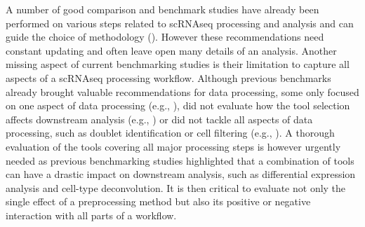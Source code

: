 \documentclass{bmcart}
\begin{document}
A number of good comparison and benchmark studies have already been performed on various steps related to scRNAseq processing and analysis and can guide the choice of methodology (\citealp{CobosDeconvolution2020, colePerformance2018, DalMolinDE2017, duoClustering2018, freytagComparison2018, GaoProcessing2020, HeiserDimred2019, HouImput2020, JaakkolaDE2017, KrzakClust2019, SonesonDE2018, SunDimRed2019, tianMixology2018, TranBatch2020, TsuyuzakiPCA2020, viethSystematic2019, WangDE2019, YipHVGs2018, ZhangImput2018}). However these recommendations need constant updating and often leave open many details of an analysis. Another missing aspect of current benchmarking studies is their limitation to capture all aspects of a scRNAseq processing workflow. Although previous benchmarks already brought valuable recommendations for data processing, some only focused on one aspect of data processing (e.g., \citealp{SunDimRed2019}), did not evaluate how the tool selection affects downstream analysis (e.g., \citealp{TsuyuzakiPCA2020}) or did not tackle all aspects of data processing, such as doublet identification or cell filtering (e.g., \citealp{viethSystematic2019}). A thorough evaluation of the tools covering all major processing steps is however urgently needed as previous benchmarking studies highlighted that a combination of tools can have a drastic impact on downstream analysis, such as differential expression analysis and cell-type deconvolution\cite{viethSystematic2019,CobosDeconvolution2020}. It is then critical to evaluate not only the single effect of a preprocessing method but also its positive or negative interaction with all parts of a workflow.
\end{document}
